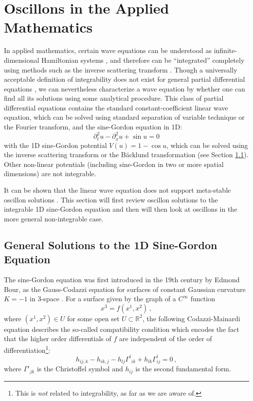 \documentclass[11pt]{book}
\begin{document}
\section{Oscillons in the Applied Mathematics}\label{litrev:appm}
In applied mathematics, certain wave equations can be understood as infinite-dimensional Hamiltonian systems \cite{intsys}, and therefore can be ``integrated'' completely using methods such as the inverse scattering transform \cite{intsys, spiro, ablowitz}. Though a universally acceptable definition of integrability does not exist for general partial differential equations \cite{intsys}, we can nevertheless characterize a wave equation by whether one can find all its solutions using some analytical procedure. This class of partial differential equations contains the standard constant-coefficient linear wave equation, which can be solved using standard separation of variable technique or the Fourier transform, and the sine-Gordon equation in 1D:
\begin{equation}
  \partial^2_t u - \partial^2_x u + \sin u = 0
\end{equation}
with the 1D sine-Gordon potential $V(u) = 1-\cos u$, which can be solved using the inverse scattering transform or the B\"acklund transformation (see Section \ref{litrev:gensolsg1d}). Other non-linear potentials (including sine-Gordon in two or more spatial dimensions) are not integrable.

It can be shown that the linear wave equation does not support meta-stable oscillon solutions \cite{Copeland:1995fq}. This section will first review oscillon solutions to the integrable 1D sine-Gordon equation and then will then look at oscillons in the more general non-integrable case.

\subsection{General Solutions to the 1D Sine-Gordon Equation}\label{litrev:gensolsg1d}

The sine-Gordon equation was first introduced in the 19th century by Edmond Bour, as the Gauss-Codazzi equation for surfaces of constant Gaussian curvature $K=-1$ in 3-space \cite{bour}. For a surface given by the graph of a $C^\infty$ function
\begin{equation}
  x^3 = f(x^1, x^2)\,,
\end{equation}
where $(x^1,x^2)\in U$ for some open set $U\subset \mathbb{R}^2$, the following Codazzi-Mainardi equation describes the so-called compatibility condition which encodes the fact that the higher order differentials of $f$ are independent of the order of differentiation\footnote{This is \emph{not} related to integrability, as far as we are aware of.}:
\begin{equation}\label{codazzi}
  h_{ij,k} - h_{ik,j} - h_{lj}\Gamma ^l{}_{ik} + h_{lk}\Gamma^l_{ij}=0\,,
\end{equation}
where $\Gamma^i{}_{jk}$ is the Christoffel symbol and $h_{ij}$ is the second fundamental form.
\end{document}
